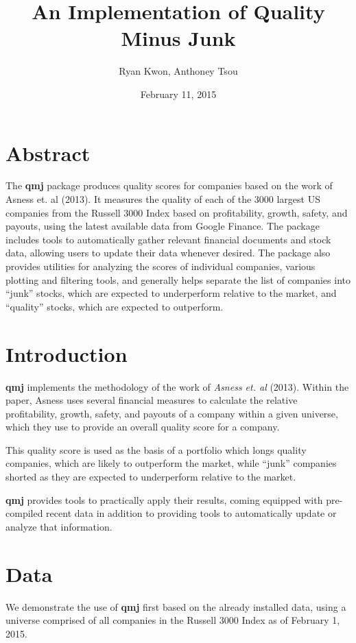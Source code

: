 \documentclass[titlepage]{article}
\author{Ryan Kwon, Anthoney Tsou}
\title{An Implementation of Quality Minus Junk}
\date{February 11, 2015}
\begin{document}

\maketitle

\section*{Abstract}
The \textbf{qmj} package produces quality scores for companies based on the work of Asness et. al (2013). It measures the quality of each of the 3000 largest US companies from the Russell 3000 Index based on profitability, growth, safety, and payouts, using the latest available data from Google Finance. The package includes tools to automatically gather relevant financial documents and stock data, allowing users to update their data whenever desired. The package also provides utilities for analyzing the scores of individual companies, various plotting and filtering tools, and generally helps separate the list of companies into ``junk'' stocks, which are expected to underperform relative to the market, and ``quality'' stocks, which are expected to outperform. 

\section*{Introduction}
\textbf{qmj} implements the methodology of the work of \emph{Asness et. al} (2013). Within the paper, Asness uses several financial measures to calculate the relative profitability, growth, safety, and payouts of a company within a given universe, which they use to provide an overall quality score for a company.

This quality score is used as the basis of a portfolio which longs quality companies, which are likely to outperform the market, while ``junk'' companies shorted as they are expected to underperform relative to the market.

\textbf{qmj} provides tools to practically apply their results, coming equipped with pre-compiled recent data in addition to providing tools to automatically update or analyze that information.

\section*{Data}
We demonstrate the use of \textbf{qmj} first based on the already installed data, using a universe comprised of all companies in the Russell 3000 Index as of February 1, 2015.
\end{document}
